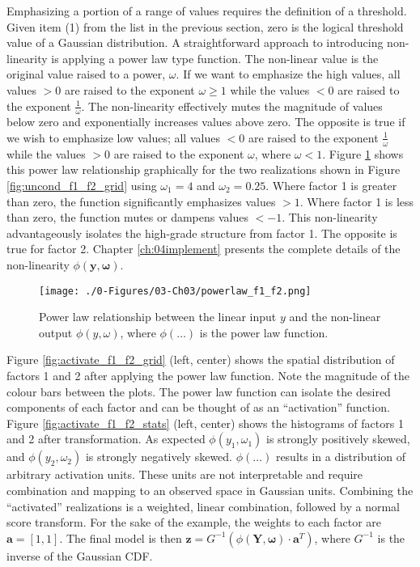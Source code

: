 Emphasizing a portion of a range of values requires the definition of a threshold. Given item (1) from the list in the previous section, zero is the logical threshold value of a Gaussian distribution. A straightforward approach to introducing non-linearity is applying a power law type function. The non-linear value is the original value raised to a power, $\omega$. If we want to emphasize the high values, all values $> 0$ are raised to the exponent $\omega \geq 1$ while the values $< 0$ are raised to the exponent $\frac{1}{\omega}$. The non-linearity effectively mutes the magnitude of values below zero and exponentially increases values above zero. The opposite is true if we wish to emphasize low values; all values $< 0$ are raised to the exponent $\frac{1}{\omega}$ while the values $> 0$ are raised to the exponent $\omega$, where $\omega < 1$. Figure \ref{fig:powerlaw_f1_f2} shows this power law relationship graphically for the two realizations shown in Figure \ref{fig:uncond_f1_f2_grid} using $\omega_{1}=4$ and $\omega_{2}=0.25$. Where factor 1 is greater than zero, the function significantly emphasizes values $> 1$. Where factor 1 is less than zero, the function mutes or dampens values $< -1$. This non-linearity advantageously isolates the high-grade structure from factor 1. The opposite is true for factor 2. Chapter \ref{ch:04implement} presents the complete details of the non-linearity $\phi(\mathbf{y}, \boldsymbol{\omega})$.

\begin{figure}[htb!]
    \centering
    \texttt{[image: ./0-Figures/03-Ch03/powerlaw\_f1\_f2.png]}
    \caption{Power law relationship between the linear input $y$ and the non-linear output $\phi(y, \omega)$, where $\phi(\dots)$ is the power law function. }
    \label{fig:powerlaw_f1_f2}
\end{figure}

Figure \ref{fig:activate_f1_f2_grid} (left, center) shows the spatial distribution of factors 1 and 2 after applying the power law function. Note the magnitude of the colour bars between the plots. The power law function can isolate the desired components of each factor and can be thought of as an ``activation'' function. Figure \ref{fig:activate_f1_f2_stats} (left, center) shows the histograms of factors 1 and 2 after transformation. As expected $\phi(y_{1}, \omega_{1})$ is strongly positively skewed, and $\phi(y_{2}, \omega_{2})$ is strongly negatively skewed. $\phi(\dots)$ results in a distribution of arbitrary activation units. These units are not interpretable and require combination and mapping to an observed space in Gaussian units. Combining the ``activated'' realizations is a weighted, linear combination, followed by a normal score transform. For the sake of the example, the weights to each factor are $\mathbf{a} = [1,1]$. The final model is then $\mathbf{z} = G^{-1}(\phi(\mathbf{Y}, \boldsymbol{\omega}) \cdot \mathbf{a}^{T})$, where $G^{-1}$ is the inverse of the Gaussian \gls{CDF}.

